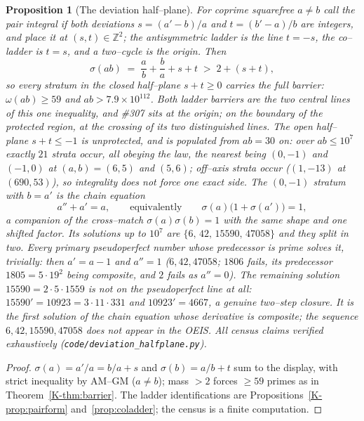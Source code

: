 \documentclass[11pt]{article}
\newtheorem{proposition}[theorem]{Proposition}
\theoremstyle{definition}
\begin{document}
\begin{proposition}[The deviation half--plane]\label{prop:halfplane}
For coprime squarefree $a\neq b$ call the pair \emph{integral} if both deviations
$s=(a'-b)/a$ and $t=(b'-a)/b$ are integers, and place it at $(s,t)\in\mathbb{Z}^2$; the
antisymmetric ladder is the line $t=-s$, the co--ladder is $t=s$, and a two--cycle is the origin.
Then
\[ \sigma(ab)\;=\;\frac ab+\frac ba+s+t\;>\;2+(s+t), \]
so \emph{every} stratum in the closed half--plane $s+t\ge0$ carries the full barrier:
$\omega(ab)\ge59$ and $ab>7.9\times10^{112}$. Both ladder barriers are the two central lines of
this one inequality, and \#307 sits at the origin; on the boundary of the protected region, at
the crossing of its two distinguished lines. The open half--plane $s+t\le-1$ is unprotected, and is
populated from $ab=30$ on: over $ab\le10^7$ exactly $21$ strata occur, all obeying the law, the
nearest being $(0,-1)$ and $(-1,0)$ at $(a,b)=(6,5)$ and $(5,6)$; off--axis strata occur
($(1,-13)$ at $(690,53)$), so integrality does not force one exact side. The $(0,-1)$ stratum with
$b=a'$ is the chain equation
\[ a''+a'=a,\qquad\text{equivalently}\qquad \sigma(a)\bigl(1+\sigma(a')\bigr)=1, \]
a companion of the cross--match $\sigma(a)\sigma(b)=1$ with the same shape and one shifted factor.
Its solutions up to $10^7$ are $\{6,\,42,\,15590,\,47058\}$ and they split in two. Every primary
pseudoperfect number whose predecessor is \emph{prime} solves it, trivially: then $a'=a-1$ and
$a''=1$ ($6,42,47058$; $1806$ fails, its predecessor $1805=5\cdot19^2$ being composite, and $2$
fails as $a''=0$). The remaining solution $15590=2\cdot5\cdot1559$ is not on the pseudoperfect line
at all: $15590'=10923=3\cdot11\cdot331$ and $10923'=4667$, a genuine two--step closure. It is the
first solution of the chain equation whose derivative is composite; the sequence
$6,42,15590,47058$ does not appear in the OEIS. All census claims verified exhaustively
(\texttt{code/deviation\_halfplane.py}).
\end{proposition}
\begin{proof}
$\sigma(a)=a'/a=b/a+s$ and $\sigma(b)=a/b+t$ sum to the display, with strict inequality by AM--GM
($a\neq b$); mass $>2$ forces $\ge59$ primes as in Theorem~\ref{K-thm:barrier}. The ladder
identifications are Propositions~\ref{K-prop:pairform} and~\ref{prop:coladder}; the census is a
finite computation.
\end{proof}
\end{document}
